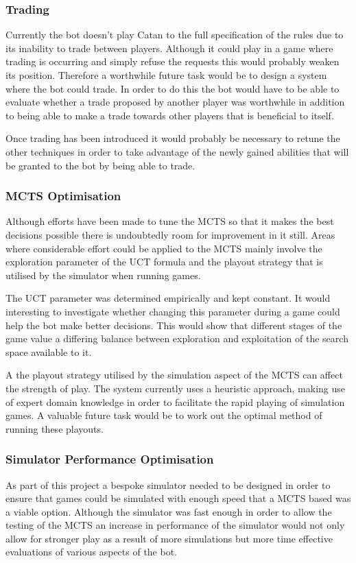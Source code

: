 \documentclass[]{article}
\begin{document}
\subsubsection{Trading}
Currently the bot doesn't play Catan to the full specification of the rules due to its inability to trade between players. Although it could play in a game where trading is occurring and simply refuse the requests this would probably weaken its position. Therefore a worthwhile future task would be to design a system where the bot could trade. In order to do this the bot would have to be able to evaluate whether a trade proposed by another player was worthwhile in addition to being able to make a trade towards other players that is beneficial to itself.

Once trading has been introduced it would probably be necessary to retune the other techniques in order to take advantage of the newly gained abilities that will be granted to the bot by being able to trade.

\subsubsection{MCTS Optimisation}
Although efforts have been made to tune the MCTS so that it makes the best decisions possible there is undoubtedly room for improvement in it still. Areas where considerable effort could be applied to the MCTS mainly involve the exploration parameter of the UCT formula and the playout strategy that is utilised by the simulator when running games. 

The UCT parameter was determined empirically and kept constant. It would interesting to investigate whether changing this parameter during a game could help the bot make better decisions. This would show that different stages of the game value a differing balance between exploration and exploitation of the search space available to it.

A the playout strategy utilised by the simulation aspect of the MCTS can affect the strength of play. The system currently uses a heuristic approach, making use of expert domain knowledge in order to facilitate the rapid playing of simulation games. A valuable future task would be to work out the optimal method of running these playouts. 

\subsubsection{Simulator Performance Optimisation}
As part of this project a bespoke simulator needed to be designed in order to ensure that games could be simulated with enough speed that a MCTS based was a viable option. Although the simulator was fast enough in order to allow the testing of the MCTS an increase in performance of the simulator would not only allow for stronger play as a result of more simulations but more time effective evaluations of various aspects of the bot.
\end{document}
